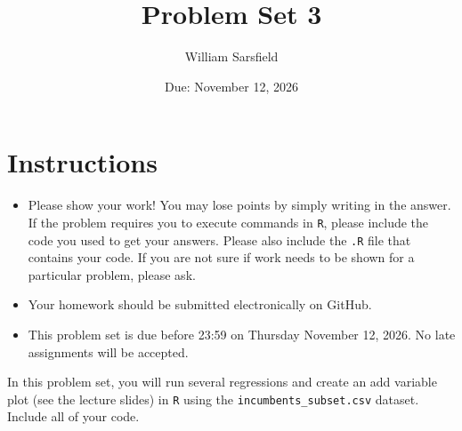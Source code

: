 \documentclass[12pt,letterpaper]{article}
\title{Problem Set 3}
\date{Due: November 12, 2026}
\author{William Sarsfield}
\begin{document}
	\maketitle
	\section*{Instructions}
	\begin{itemize}
		\item Please show your work! You may lose points by simply writing in the answer. If the problem requires you to execute commands in \texttt{R}, please include the code you used to get your answers. Please also include the \texttt{.R} file that contains your code. If you are not sure if work needs to be shown for a particular problem, please ask.
	\item Your homework should be submitted electronically on GitHub.
	\item This problem set is due before 23:59 on Thursday November 12, 2026. No late assignments will be accepted.

	\end{itemize}

		\vspace{.25cm}
	
\noindent In this problem set, you will run several regressions and create an add variable plot (see the lecture slides) in \texttt{R} using the \texttt{incumbents\_subset.csv} dataset. Include all of your code.

	\vspace{.5cm}
\end{document}
